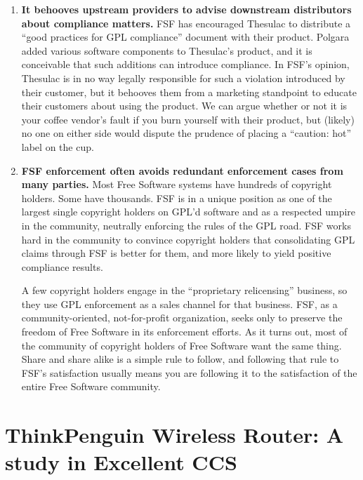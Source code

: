 \begin{enumerate}
\item {\bf It behooves upstream providers to advise downstream
  distributors about compliance matters.}  FSF has encouraged Thesulac to
  distribute a ``good practices for GPL compliance'' document with their
  product. Polgara added various software components to Thesulac's
  product, and it is conceivable that such additions can introduce
  compliance. In FSF's opinion, Thesulac is in no way legally responsible
  for such a violation introduced by their customer, but it behooves them
  from a marketing standpoint to educate their customers about using the
  product. We can argue whether or not it is your coffee vendor's fault
  if you burn yourself with their product, but (likely) no one on either
  side would dispute the prudence of placing a ``caution: hot'' label on
  the cup.

\item {\bf FSF enforcement often avoids redundant enforcement cases from
  many parties.}  Most Free Software systems have hundreds of copyright
  holders. Some have thousands. FSF is in a unique position as one of
  the largest single copyright holders on GPL'd software and as a
  respected umpire in the community, neutrally enforcing the rules of the
  GPL road. FSF works hard in the community to convince copyright
  holders that consolidating GPL claims through FSF is better for them,
  and more likely to yield positive compliance results.

  A few copyright holders engage in the ``proprietary relicensing''
  business, so they use GPL enforcement as a sales channel for that
  business. FSF, as a community-oriented, not-for-profit organization,
  seeks only to preserve the freedom of Free Software in its enforcement
  efforts. As it turns out, most of the community of copyright holders
  of Free Software want the same thing. Share and share alike is a
  simple rule to follow, and following that rule to FSF's satisfaction
  usually means you are following it to the satisfaction of the entire
  Free Software community.

\end{enumerate}


\chapter{ThinkPenguin Wireless Router: A study in Excellent CCS}

